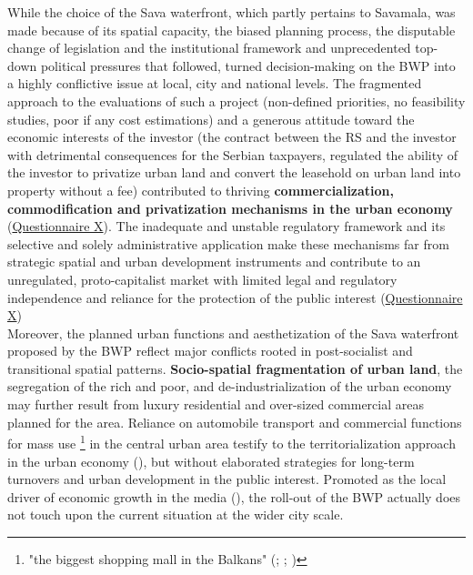 \documentclass[11pt]{report}
\begin{document}
While the choice of the Sava waterfront, which partly pertains to Savamala, was made because of its spatial capacity, the biased planning process, the disputable change of legislation and the institutional framework and unprecedented top-down political pressures that followed, turned decision-making on the BWP into a highly conflictive issue at local, city and national levels. The fragmented approach to the evaluations of such a project (non-defined priorities, no feasibility studies, poor if any cost estimations) and a generous attitude toward the economic interests of the investor (the contract between the RS and the investor with detrimental consequences for the Serbian taxpayers, regulated the ability of the investor to privatize urban land and convert the leasehold on urban land into property without a fee) contributed to thriving  \textbf{commercialization, commodification and privatization mechanisms in the urban economy}
(\href{Questionnaire Experts Savamala}{Questionnaire X}).
The inadequate and unstable regulatory framework and its selective and solely administrative application make these mechanisms far from strategic spatial and urban development instruments and contribute to an unregulated, proto-capitalist market with limited legal and regulatory independence and reliance for the protection of the public interest 
(\href{Questionnaire Experts Savamala}{Questionnaire X})
\\

Moreover, the planned urban functions and aesthetization of the Sava waterfront proposed by the BWP reflect major conflicts rooted in post-socialist and transitional spatial patterns.
\textbf{Socio-spatial fragmentation of urban land}, the segregation of the rich and poor, and de-industrialization of the urban economy may further result from luxury residential and over-sized commercial areas planned for the area.
Reliance on automobile transport and commercial functions for mass use
\footnote{"the biggest shopping mall in the Balkans" (\href{eKapija}{\citealt{ekapija_beogradska_2014}}; \href{ref}{\citealt{Mucibabic politika}}; \href{N1}{\citealt{n1_beograd_2016}})}
in the central urban area testify to the territorialization approach in the urban economy (\href{Hirt}{\cite{hirt_belgrade_2009}}), but without elaborated strategies for long-term turnovers and urban development in the public interest. Promoted as the local driver of economic growth in the media (\href{Novosti}{\citealt{novosti_vucic_2016}}), the roll-out of the BWP actually does not touch upon the current situation at the wider city scale.
\\
\end{document}

